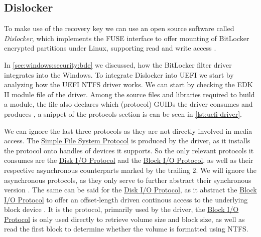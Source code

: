 \subsection{Dislocker}

To make use of the recovery key we can use an open source software called \emph{Dislocker}, which implements the \ac{FUSE} interface to offer mounting of BitLocker encrypted partitions under Linux, supporting read and write access \cite{dislocker}.

In \autoref{sec:windows:security:bde} we discussed, how the BitLocker filter driver integrates into the Windows.
To integrate Dislocker into \ac{UEFI} we start by analyzing how the \ac{UEFI} \ac{NTFS} driver works.
We can start by checking the \ac{EDK} II module file of the driver.
Among the source files and libraries required to build a module, the file also declares which (protocol) \acp{GUID} the driver consumes and produces \cite{tianocore-edk2-module-writer-s-guide}, a snippet of the protocols section is can be seen in \autoref{lst:uefi-driver}.



We can ignore the last three protocols as they are not directly involved in media access.
The \hyperref[lst:simple-file-system-protocol]{Simple File System Protocol} is produced by the driver, as it installs the protocol onto handles of devices it supports.
So the only relevant protocols it consumes are the \hyperref[lst:disk-io-protocol]{Disk \ac{I/O} Protocol} and the \hyperref[lst:block-io-protocol]{Block \ac{I/O} Protocol}, as well as their respective asynchronous counterparts marked by the trailing 2.
We will ignore the asynchronous protocols, as they only serve to further abstract their synchronous version \cite[Sections 13.8 and 13.10]{uefi-spec}.
The same can be said for the \hyperref[lst:disk-io-protocol]{Disk \ac{I/O} Protocol}, as it abstract the \hyperref[lst:block-io-protocol]{Block \ac{I/O} Protocol} to offer an offset-length driven continous access to the underlying block device \cite[Section 13.7]{uefi-spec}.
It is the protocol, primarily used by the driver, the \hyperref[lst:block-io-protocol]{Block \ac{I/O} Protocol} is only used directly to retrieve volume size and block size, as well as read the first block to determine whether the volume is formatted using \ac{NTFS}.

